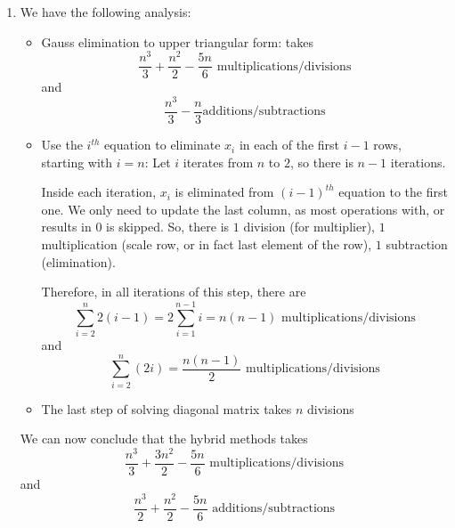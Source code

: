 \documentclass[../../../../Assignments]{subfiles}
\begin{document}
\begin{solution}
    \begin{enumerate}[label = \alph*)]
        \item We have the following analysis:
            \begin{itemize}
                \item Gauss elimination to upper triangular form: takes
                    \[\frac{n^3}{3} + \frac{n^2}{2} - \frac{5n}{6} \text{ multiplications/divisions}\]
                    and
                    \[\frac{n^3}{3} - \frac{n}{3} \text{additions/subtractions}\]
                \item Use the \(i^{th}\) equation to eliminate \(x_i\) in each
                    of the first \(i - 1\) rows, starting with \(i = n\): Let
                    \(i\) iterates from \(n\) to \(2\), so there is \(n - 1\)
                    iterations.

                    Inside each iteration, \(x_i\) is eliminated from \((i -
                    1)^{th}\) equation to the first one. We only need to update
                    the last column, as most operations with, or results in
                    \(0\) is skipped. So, there is \(1\) division (for
                    multiplier), \(1\) multiplication (scale row, or in fact
                    last element of the row), \(1\) subtraction (elimination).

                    Therefore, in all iterations of this step, there are
                    \[\sum_{i = 2}^{n} 2(i - 1) = 2 \sum_{i = 1}^{n - 1} i = n(n - 1) \text{ multiplications/divisions}\]
                    and
                    \[\sum_{i = 2}^{n} (2i) = \frac{n(n - 1)}{2} \text{ multiplications/divisions}\]
                \item The last step of solving diagonal matrix takes \(n\)
                    divisions
            \end{itemize}

            We can now conclude that the hybrid methods takes
            \[\frac{n^3}{3} + \frac{3n^2}{2} - \frac{5n}{6} \text{ multiplications/divisions}\]
            and
            \[\frac{n^3}{2} + \frac{n^2}{2} - \frac{5n}{6} \text{ additions/subtractions}\]


\end{enumerate}
\end{solution}
\end{document}

